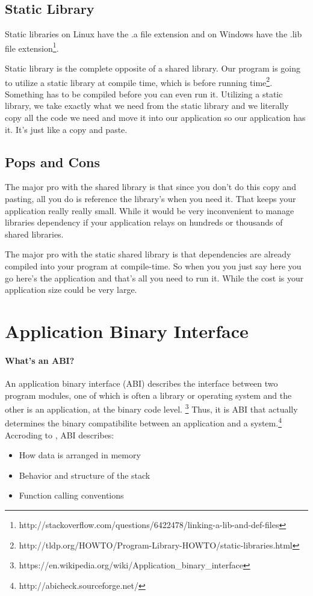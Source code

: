 	\subsection{Static Library}
	Static libraries on Linux have the .a file extension and on Windows have the .lib file extension\footnote{http://stackoverflow.com/questions/6422478/linking-a-lib-and-def-files}.
	
	Static library is the complete opposite of a shared library. Our program is going to utilize a static library at compile time, which is before running time\footnote{http://tldp.org/HOWTO/Program-Library-HOWTO/static-libraries.html}. Something has to be compiled before you can even run it. Utilizing a static library, we take exactly what we need from the static library and we literally copy all the code we need and move it into our application so our application has it. It's just like a copy and paste.
	
	\subsection{Pops and Cons}
    The major pro with the shared library is that since you don't do this copy and pasting, all you do is reference the library's when you need it. That keeps your application really really small. While it would be very inconvenient to manage libraries dependency if your application relays on hundreds or thousands of shared libraries.    
    
    The major pro with the static shared library is that dependencies are already compiled into your program at compile-time. So when you you just say here you go here's the application and that's all you need to run it. While the cost is your application size could be very large.




\section{Application Binary Interface}

    \paragraph{What's an ABI?}
    An application binary interface (ABI) describes the interface between two program modules, one of which is often a library or operating system  and the other is an application, at the binary code level. \footnote{https://en.wikipedia.org/wiki/Application\_binary\_interface}
    Thus, it is ABI that actually determines the binary compatibilite between an application and a system.\footnote{http://abicheck.sourceforge.net/}\newline    
   Accroding to \cite{ALTERA-14}, ABI describes:   \begin{itemize}
      \item  How data is arranged in memory
      \item  Behavior and structure of the stack
      \item Function calling conventions
    \end{itemize}
    
